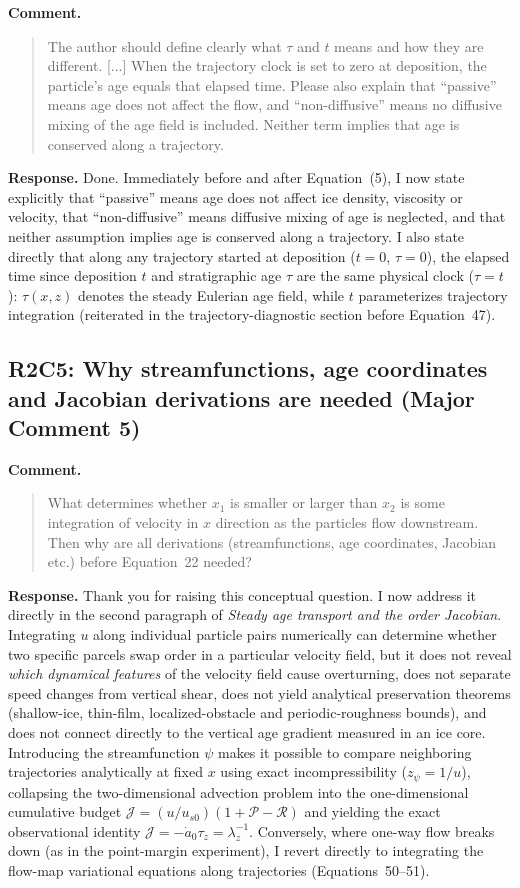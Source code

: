 \documentclass[11pt]{article}
\newcommand{\response}[1]{\noindent\textcolor{responseblue}{#1}}
\begin{document}
\noindent\textbf{Comment.}
\begin{quote}
The author should define clearly what \(\tau\) and \(t\) means and how they are different. [...] When the trajectory clock is set to zero at deposition, the particle's age equals that elapsed time. Please also explain that ``passive'' means age does not affect the flow, and ``non-diffusive'' means no diffusive mixing of the age field is included. Neither term implies that age is conserved along a trajectory.
\end{quote}

\response{\textbf{Response.} Done. Immediately before and after Equation~(5), I now state explicitly that ``passive'' means age does not affect ice density, viscosity or velocity, that ``non-diffusive'' means diffusive mixing of age is neglected, and that neither assumption implies age is conserved along a trajectory. I also state directly that along any trajectory started at deposition (\(t=0\), \(\tau=0\)), the elapsed time since deposition \(t\) and stratigraphic age \(\tau\) are the same physical clock (\(\tau=t\)): \(\tau(x,z)\) denotes the steady Eulerian age field, while \(t\) parameterizes trajectory integration (reiterated in the trajectory-diagnostic section before Equation~47).}

\subsection*{R2C5: Why streamfunctions, age coordinates and Jacobian derivations are needed (Major Comment 5)}

\noindent\textbf{Comment.}
\begin{quote}
What determines whether \(x_1\) is smaller or larger than \(x_2\) is some integration of velocity in \(x\) direction as the particles flow downstream. Then why are all derivations (streamfunctions, age coordinates, Jacobian etc.) before Equation~22 needed?
\end{quote}

\response{\textbf{Response.} Thank you for raising this conceptual question. I now address it directly in the second paragraph of \emph{Steady age transport and the order Jacobian}. Integrating \(u\) along individual particle pairs numerically can determine whether two specific parcels swap order in a particular velocity field, but it does not reveal \emph{which dynamical features} of the velocity field cause overturning, does not separate speed changes from vertical shear, does not yield analytical preservation theorems (shallow-ice, thin-film, localized-obstacle and periodic-roughness bounds), and does not connect directly to the vertical age gradient measured in an ice core. Introducing the streamfunction \(\psi\) makes it possible to compare neighboring trajectories analytically at fixed \(x\) using exact incompressibility (\(z_\psi=1/u\)), collapsing the two-dimensional advection problem into the one-dimensional cumulative budget \(\mathcal{J}=(u/u_{s0})(1+\mathcal{P}-\mathcal{R})\) and yielding the exact observational identity \(\mathcal{J}=-\dot a_0\tau_z=\lambda_z^{-1}\). Conversely, where one-way flow breaks down (as in the point-margin experiment), I revert directly to integrating the flow-map variational equations along trajectories (Equations~50--51).}
\end{document}
